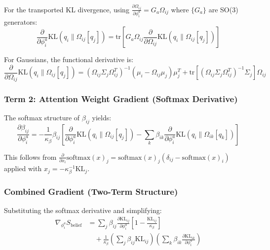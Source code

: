 \documentclass[11pt]{article}
\begin{document}
For the transported KL divergence, using $\frac{\partial \Omega_{ij}}{\partial \phi_i^a} = G_a \Omega_{ij}$ where $\{G_a\}$ are SO(3) generators:
\begin{equation}
\frac{\partial}{\partial \phi_i^a}\mathrm{KL}(q_i \| \Omega_{ij}[q_j]) = \mathrm{tr}\left[G_a \Omega_{ij} \frac{\partial}{\partial \Omega_{ij}}\mathrm{KL}(q_i \| \Omega_{ij}[q_j])\right]
\end{equation}

For Gaussians, the functional derivative is:
\begin{equation}
\frac{\partial}{\partial \Omega_{ij}}\mathrm{KL}(q_i \| \Omega_{ij}[q_j]) = (\Omega_{ij}\Sigma_j\Omega_{ij}^T)^{-1}(\mu_i - \Omega_{ij}\mu_j)\mu_j^T + \mathrm{tr}\left[(\Omega_{ij}\Sigma_j\Omega_{ij}^T)^{-1}\Sigma_j\right]\Omega_{ij}
\end{equation}

\subsubsection*{Term 2: Attention Weight Gradient (Softmax Derivative)}

The softmax structure of $\beta_{ij}$ yields:
\begin{equation}
\frac{\partial \beta_{ij}}{\partial \phi_i^a} = -\frac{1}{\kappa_\beta} \beta_{ij} \left[\frac{\partial}{\partial \phi_i^a}\mathrm{KL}(q_i \| \Omega_{ij}[q_j]) - \sum_k \beta_{ik} \frac{\partial}{\partial \phi_i^a}\mathrm{KL}(q_i \| \Omega_{ik}[q_k])\right]
\end{equation}

This follows from $\frac{\partial}{\partial x_i}\mathrm{softmax}(x)_j = \mathrm{softmax}(x)_j(\delta_{ij} - \mathrm{softmax}(x)_i)$ applied with $x_j = -\kappa_\beta^{-1}\mathrm{KL}_j$.

\subsubsection*{Combined Gradient (Two-Term Structure)}

Substituting the softmax derivative and simplifying:
\begin{align}
\nabla_{\phi_i^a} S_{\mathrm{belief}} &= \sum_j \beta_{ij}\frac{\partial \mathrm{KL}_{ij}}{\partial \phi_i^a}\left[1 - \frac{\mathrm{KL}_{ij}}{\kappa_\beta}\right] \nonumber \\
&\quad + \frac{1}{\kappa_\beta}\left(\sum_j \beta_{ij}\mathrm{KL}_{ij}\right)\left(\sum_k \beta_{ik}\frac{\partial \mathrm{KL}_{ik}}{\partial \phi_i^a}\right)
\end{align}
\end{document}
